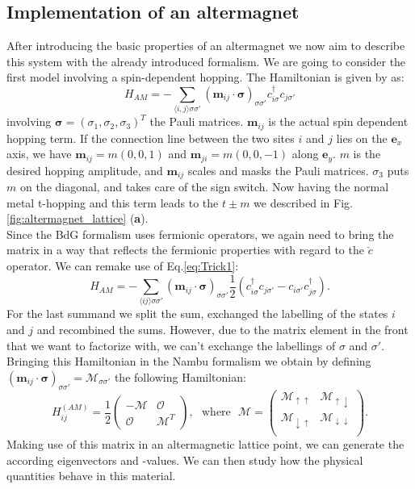\documentclass[../main.tex]{main.tex}
\begin{document}
\subsection{Implementation of an altermagnet}
After introducing the basic properties of an altermagnet we now aim to describe this system with the already introduced formalism.
We are going to consider the first model involving a spin-dependent hopping. The Hamiltonian is given by \cite{Ouassou2023} as:
\begin{equation*}
    H_{AM} = -\sum_{\langle i, j\rangle\sigma\sigma'} \left(\bm{m}_{ij} \cdot \bm{\sigma}\right)_{\sigma\sigma'} c_{i\sigma}^{\dagger} c_{j\sigma'} 
\end{equation*}
involving $\bm{\sigma}=(\sigma_1, \sigma_2,\sigma_3)^T$ the Pauli matrices. $\bm{m}_{ij}$ is the actual spin dependent hopping term. If the connection line 
between the two sites $i$ and $j$ lies on the $\bm{e}_x$ axis, we have $\bm{m}_{ij} = m(0,0,1)$ and $\bm{m}_{ji} = m(0,0,-1)$ along $\bm{e}_y$. $m$ is 
the desired hopping amplitude, and $\bm{m}_{ij}$ scales and masks the Pauli matrices. $\sigma_3$ puts $m$ on the diagonal, and takes care of the sign switch. 
Now having the normal metal t-hopping and this term leads to the $t\pm m$ we
described in Fig.\ref{fig:altermagnet_lattice} (\textbf{a}).\\

Since the BdG formalism uses fermionic operators, we again need to bring the matrix in a way that reflects the fermionic properties with regard to the $\check{c}$ operator.
We can remake use of Eq.\ref{eq:Trick1}:
\begin{equation*}
    H_{AM} = -\sum_{\langle i j\rangle\sigma\sigma'} \left(\bm{m}_{ij} \cdot \bm{\sigma}\right)_{\sigma\sigma'} \frac{1}{2}\left(c_{i\sigma}^{\dagger} c_{j\sigma'} - c_{i\sigma'}c_{j\sigma}^{\dagger}\right).
\end{equation*}
For the last summand we split the sum, exchanged the labelling of the states $i$ and $j$ and recombined the sums. However, due to the matrix element in the front
that we want to factorize with, we can't exchange the labellings of $\sigma$ and $\sigma'$.
Bringing this Hamiltonian in the Nambu formalism we obtain by defining
$\left(\bm{m}_{ij} \cdot \bm{\sigma}\right)_{\sigma\sigma'} = \mathcal{M}_{\sigma\sigma'}$ 
the following Hamiltonian:
\begin{equation*}
    H^{(AM)}_{ij} = \frac{1}{2}\begin{pmatrix}
        -\mathcal{M} & \mathcal{O}\\
        \mathcal{O} & \mathcal{M}^T
    \end{pmatrix}
    ,~~~ \text{where} ~~~ \mathcal{M} = \begin{pmatrix}
        \mathcal{M}_{\uparrow\uparrow} & \mathcal{M}_{\uparrow\downarrow}\\
        \mathcal{M}_{\downarrow\uparrow} & \mathcal{M}_{\downarrow\downarrow}\\
    \end{pmatrix}.
\end{equation*}
Making use of this matrix in an altermagnetic lattice point, we can generate the according eigenvectors and -values. We can then study how the physical quantities 
behave in this material.\\
\end{document}
